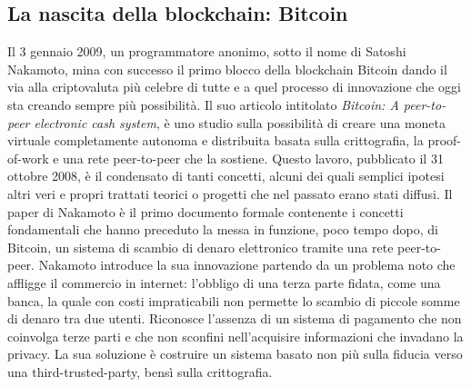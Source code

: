 	\subsection{La nascita della blockchain: Bitcoin}

	Il 3 gennaio 2009, un programmatore anonimo, sotto il nome di Satoshi Nakamoto, mina con successo il primo blocco della blockchain Bitcoin dando il via alla criptovaluta più celebre di tutte e a quel processo di innovazione che oggi sta creando sempre più possibilità. Il suo articolo intitolato \textit{Bitcoin: A peer-to-peer electronic cash system}, è uno studio sulla possibilità di creare una moneta virtuale completamente autonoma e distribuita basata sulla crittografia, la proof-of-work e una rete peer-to-peer che la sostiene\cite{nakamoto2008bitcoin}. 
	Questo lavoro, pubblicato il 31 ottobre 2008, è il condensato di tanti concetti, alcuni dei quali semplici ipotesi altri veri e propri trattati teorici o progetti che nel passato erano stati diffusi. Il paper di Nakamoto è il primo documento formale contenente i concetti fondamentali che hanno preceduto la messa in funzione, poco tempo dopo, di Bitcoin, un sistema di scambio di denaro elettronico tramite una rete peer-to-peer. Nakamoto introduce la sua innovazione partendo da un problema noto che affligge il commercio in internet: l'obbligo di una terza parte fidata, come una banca, la quale con costi impraticabili non permette lo scambio di piccole somme di denaro tra due utenti. Riconosce l'assenza di un sistema di pagamento che non coinvolga terze parti e che non sconfini nell'acquisire informazioni che invadano la privacy.
	La sua soluzione è costruire un sistema basato non più sulla fiducia verso una third-trusted-party, bensì sulla crittografia.
	
